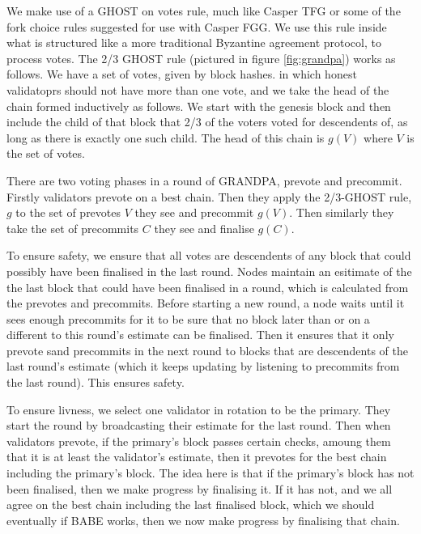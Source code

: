 We make use of a GHOST on votes rule, much like Casper TFG or some of the fork choice rules suggested for use with Casper FGG. We use this rule inside what is structured like a more traditional Byzantine agreement protocol, to process votes. The 2/3 GHOST rule (pictured in figure \ref{fig:grandpa})  works as follows. We have a set of votes, given by block hashes.  in which honest validatoprs should not have more than one vote, and we take the head of the chain formed inductively as follows. We start with the genesis block and then include the child of that block that 2/3 of the voters voted for descendents of, as long as there is exactly one such child. The head of this chain is $g(V)$ where $V$ is the set of votes.

There are two voting phases in a round of GRANDPA, prevote and precommit. Firstly validators prevote on a best chain. Then they apply the 2/3-GHOST rule, $g$ to the set of prevotes $V$ they see and precommit $g(V)$. Then similarly they take the set of precommits $C$ they see and finalise $g(C)$.

To ensure safety, we ensure that all votes are descendents of any block that could possibly have been finalised in the last round. Nodes maintain an esitimate of the the last block that could have been finalised in a round, which is calculated from the prevotes and precommits. Before starting a new round, a node waits until it sees enough precommits for it to be sure that no block later than or on a different to this round's estimate can be finalised. Then it ensures that it only prevote sand precommits in the next round to blocks that are descendents of the last round's estimate (which it keeps updating by listening to precommits from the last round). This ensures safety.

To ensure livness, we select one validator in rotation to be the primary. They start the round by broadcasting their estimate for the last round. Then when validators prevote, if the primary's block passes certain checks, amoung them that it is at least the validator's estimate, then it prevotes for the best chain including the primary's block. The idea here is that if the primary's block has not been finalised, then we make progress by finalising it. If it has not, and we all agree on the best chain including the last finalised block, which we should eventually if BABE works, then we now make progress by finalising that chain.
  


